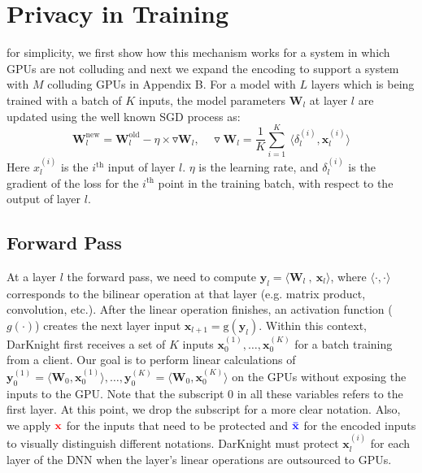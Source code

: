 \section{Privacy in Training}
\label{sec:training}
for simplicity, we first show how this mechanism works for a system in which GPUs are not colluding and next we expand the encoding to support a system with $M$ colluding GPUs in Appendix B. For a model with $L$ layers which is being trained with a batch of $K$ inputs, the model parameters $\mathbf{W}_{l}$ at layer $l$ are updated using the well known SGD process as:
\begin{equation}
\mathbf{W}^{\text{new}}_{l} = \mathbf{W}^{\text{old}}_{l} - \eta\times \triangledown \mathbf{W}_{l},\quad
\triangledown \mathbf{W}_{l}=\frac 1 K \sum_{i=1}^K ~ \langle \delta^{(i)}_{l} , {\mathbf x^{(i)}_{l}}\rangle
\label{eq:sgd}
\end{equation}
Here $x_l^{(i)}$ is the $i^{\text{th}}$ input of layer $l$. $\eta$ is the learning rate, and $\delta^{(i)}_{l}$ is the gradient of the loss for the $i^{\text{th}}$ point in the training batch, with respect to the output of layer $l$. %
\subsection{Forward Pass}
 At a layer $l$ the forward pass, we need to  compute $\mathbf y_l=\langle \mathbf W_l~,~\mathbf x_l\rangle$, where $\langle \cdot,\cdot\rangle$ corresponds to the bilinear operation at that layer (e.g. matrix product, convolution, etc.).  After the linear operation finishes, an activation function ($g(\cdot)$) creates the next layer input $\mathbf x_{l+1}=\text{g}(\mathbf y_l)$.  Within this context, DarKnight first receives a set of $K$ inputs $\mathbf x_0^{(1)},\dots,\mathbf x_0^{(K)}$ for a batch training from a client. Our goal is to perform linear calculations of $\mathbf y_0^{(1)}= \langle\mathbf W_0 , \mathbf x_0^{(1)}\rangle,\dots,\mathbf y_0^{(K)}=\langle\mathbf W_0, \mathbf x_0^{(K)}\rangle$ on the GPUs without exposing the inputs to the GPU. Note that the subscript $0$ in all these variables refers to the first layer. At this point, we drop the subscript for a more clear notation. Also, we apply $\mathbf {\color{red}x}$ for the inputs that need to be protected and $\mathbf{\color{blue}\bar{x}}$ for the encoded inputs to visually distinguish different notations. DarKnight must protect ${\mathbf x^{(i)}_{l}}$ for each layer of the DNN when the layer's linear operations are outsourced to GPUs. 
 
